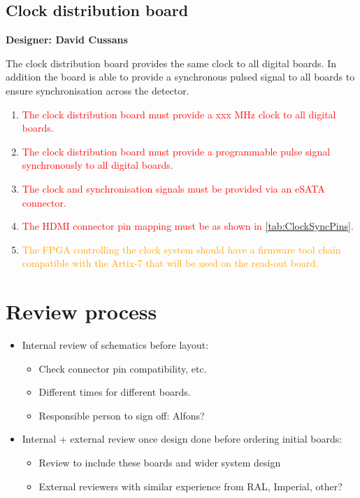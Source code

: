 \documentclass[a4paper]{article}
\newcommand{\must}[1]{\textcolor{red}{#1}}
\newcommand{\should}[1]{\textcolor{orange}{#1}}
\begin{document}
\clearpage
\newpage
\subsection{Clock distribution board}

{\bf Designer: David Cussans}

The clock distribution board provides the same clock to all digital boards.
In addition the board is able to provide a synchronous pulsed signal to all boards to ensure synchronisation across the detector.

\begin{enumerate}
    \item \must{The clock distribution board must provide a xxx MHz clock to all digital boards.}
    \item \must{The clock distribution board must provide a programmable pulse signal synchronously to all digital boards.}
    \item \must{The clock and synchronisation signals must be provided via an eSATA connector.}
    \item \must{The HDMI connector pin mapping must be as shown in \cref{tab:ClockSyncPins}.}
    \item \should{The FPGA controlling the clock system should have a firmware tool chain compatible with the Artix-7 that will be used on the read-out board.}
\end{enumerate}

\clearpage
\newpage

\section{Review process}

\begin{itemize}
    \item Internal review of schematics before layout:
    \begin{itemize}
        \item Check connector pin compatibility, etc.
        \item Different times for different boards.
        \item Responsible person to sign off: Alfons?
    \end{itemize}
    \item Internal + external review once design done before ordering initial boards:
    \begin{itemize}
        \item Review to include these boards and wider system design
        \item External reviewers with similar experience from RAL, Imperial, other?
    \end{itemize}
\end{itemize}
\end{document}
